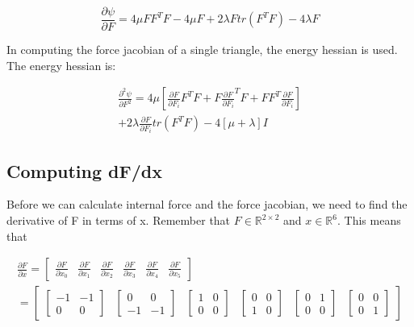 \documentclass[twocolumn,10pt]{asme2ej}
\begin{document}
\begin{equation}
\frac{\partial \psi}{\partial F} = 4\mu FF^TF - 4\mu F + 2\lambda Ftr(F^TF) -4\lambda F
\label{eq_pk1}
\end{equation}

In computing the force jacobian of a single triangle, the energy hessian is used. The energy hessian is:

\begin{equation}
  \begin{split}
\frac{\partial^2 \psi}{\partial F^2} = 4\mu [\frac{\partial F}{\partial F_i}F^TF + F\frac{\partial F}{\partial F_i}^TF + FF^T\frac{\partial F}{\partial F_i}] \\ + 2\lambda \frac{\partial F}{\partial F_i}tr(F^TF) - 4[\mu + \lambda]I
  \end{split}
\label{eq_dpdf}
\end{equation}

\subsection{Computing dF/dx}

Before we can calculate internal force and the force jacobian, we need to find the derivative of F in terms of x. Remember that $F \in \mathbb{R}^{2 \times 2}$ and $x \in \mathbb{R}^6$. This means that

\begin{equation}
  \begin{split}
    \frac{\partial F}{\partial x} = \begin{bmatrix} \frac{\partial F}{\partial x_0} & \frac{\partial F}{\partial x_1}
    & \frac{\partial F}{\partial x_2} & \frac{\partial F}{\partial x_3} & \frac{\partial F}{\partial x_4}
    & \frac{\partial F}{\partial x_5} \end{bmatrix} \\
    = \begin{bmatrix} \begin{bmatrix} -1 & -1 \\ 0 & 0 \end{bmatrix} & \begin{bmatrix} 0 & 0 \\ -1 & -1 \end{bmatrix}
  & \begin{bmatrix} 1 & 0 \\ 0 & 0 \end{bmatrix} & \begin{bmatrix} 0 & 0 \\ 1 & 0 \end{bmatrix}
  & \begin{bmatrix} 0 & 1 \\ 0 & 0 \end{bmatrix} & \begin{bmatrix} 0 & 0 \\ 0 & 1 \end{bmatrix}\end{bmatrix}
  \end{split}
\label{eq_dFdx}
\end{equation}
\end{document}
